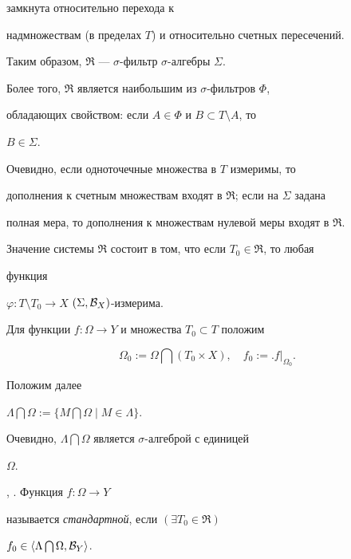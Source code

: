 замкнута относительно перехода к


надмножествам (в пределах $T$) и относительно счетных пересечений.


Таким образом, $\Re$ --- $\sigma$-фильтр $\sigma$-алгебры $\Sigma$.


Более того, $\Re$ является наибольшим из $\sigma$-фильтров $\Phi$,


обладающих свойством: если $A\in\Phi$ и $B\subset T\setminus A$, то


$B\in\Sigma$.





Очевидно, если одноточечные множества в $T$ измеримы, то


дополнения к счетным множествам входят в $\Re$; если на $\Sigma$ задана


полная мера, то дополнения к множествам нулевой меры входят в $\Re$.





Значение системы $\Re$ состоит в том, что если $T_0\in\Re$, то любая


функция


$\varphi :T\setminus T_0\to X$ $(\Sigma ,{\cal B}_X)$-измерима.





Для функции $f:\Omega\to Y$ и множества $T_0\subset T$ положим


$$


\Omega_0 := \Omega\bigcap (T_0\times X),\quad


f_0 := \bigl. f\bigr|_{\Omega _0}.


$$





Положим далее


$\Lambda\bigcap\Omega :=\{M\bigcap\Omega\mid M\in\Lambda\}$.


Очевидно, $\Lambda\bigcap\Omega$ является $\sigma$-алгеброй с единицей


$\Omega$.





\begin{defns} \cite{Sh1}, \cite{Sh2}. Функция $f:\Omega\to Y$


называется {\em стандартной}, если $(\exists T_0\in\Re)$


$f_0\in\langle \Lambda\bigcap\Omega ,{\cal B}_Y\rangle$.


\end{defns}





